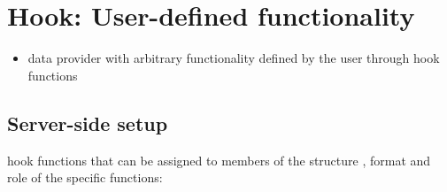 \section{Hook: User-defined functionality}
\label{sect:dataprov_hook}

\begin{itemize}
  \item data provider with arbitrary functionality defined by the user through hook functions
\end{itemize}


\subsection{Server-side setup}

hook functions that can be assigned to members of the structure ,
format and role of the specific functions:
